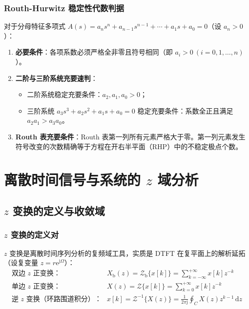 \documentclass[11pt,a4paper,fontset=fandol]{ctexart}
\theoremstyle{remark}
\begin{document}
\subsubsection{Routh-Hurwitz 稳定性代数判据}
对于分母特征多项式 $A(s) = a_n s^n + a_{n-1}s^{n-1} + \cdots + a_1 s + a_0 = 0$（设 $a_n > 0$）：
\begin{enumerate}
    \item \textbf{必要条件}：各项系数必须严格全非零且符号相同（即 $a_i > 0 \ (i=0, 1, \dots, n)$）。
    \item \textbf{二阶与三阶系统充要速判}：
    \begin{itemize}
        \item 二阶系统稳定充要条件：$a_2, a_1, a_0 > 0$；
        \item 三阶系统 $a_3 s^3 + a_2 s^2 + a_1 s + a_0 = 0$ 稳定充要条件：系数全正且满足 $a_2 a_1 > a_3 a_0$。
    \end{itemize}
    \item \textbf{Routh 表充要条件}：Routh 表第一列所有元素严格大于零。第一列元素发生符号改变的次数精确等于方程在开右半平面（RHP）中的不稳定极点个数。
\end{enumerate}

\section{离散时间信号与系统的 $z$ 域分析}

\subsection{$z$ 变换的定义与收敛域}

\subsubsection{$z$ 变换的定义对}
$z$ 变换是离散时间序列分析的复频域工具，实质是 DTFT 在复平面上的解析延拓（设复变量 $z = r\mathrm{e}^{\mathrm{j}\Omega}$）：
\begin{align}
    \text{双边 $z$ 正变换}：& X_{\mathrm{b}}(z) = \mathcal{Z}_{\mathrm{b}}\{x[k]\} = \sum_{k=-\infty}^{+\infty} x[k] z^{-k} \\
    \text{单边 $z$ 正变换}：& X(z) = \mathcal{Z}\{x[k]\} = \sum_{k=0}^{+\infty} x[k] z^{-k} \\
    \text{逆 $z$ 变换（环路围道积分）}：& x[k] = \mathcal{Z}^{-1}\{X(z)\} = \frac{1}{2\pi \mathrm{j}} \oint_C X(z) z^{k-1}\,\mathrm{d}z
\end{align}
\end{document}
